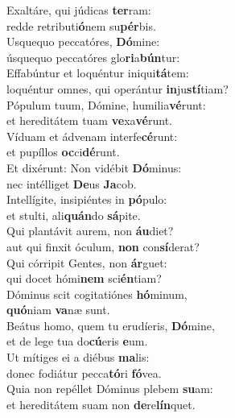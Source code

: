 \evenverse Exaltáre, qui júdicas \textbf{ter}ram:~\*\\
\evenverse redde retributi\textbf{ó}nem su\textbf{pér}bis.\\
\oddverse Usquequo peccatóres, \textbf{Dó}mine:~\*\\
\oddverse úsquequo peccatóres glo\textbf{ri}a\textbf{bún}tur:\\
\evenverse Effabúntur et loquéntur iniqui\textbf{tá}tem:~\*\\
\evenverse loquéntur omnes, qui operántur \textbf{in}ju\textbf{stí}tiam?\\
\oddverse Pópulum tuum, Dómine, humilia\textbf{vé}runt:~\*\\
\oddverse et hereditátem tuam \textbf{ve}xa\textbf{vé}runt.\\
\evenverse Víduam et ádvenam interfe\textbf{cé}runt:~\*\\
\evenverse et pupíllos \textbf{oc}ci\textbf{dé}runt.\\
\oddverse Et dixérunt: Non vidébit \textbf{Dó}minus:~\*\\
\oddverse nec intélliget \textbf{De}us \textbf{Ja}cob.\\
\evenverse Intellígite, insipiéntes in \textbf{pó}pulo:~\*\\
\evenverse et stulti, ali\textbf{quán}do \textbf{sá}pite.\\
\oddverse Qui plantávit aurem, non \textbf{áu}diet?~\*\\
\oddverse aut qui finxit óculum, \textbf{non} con\textbf{sí}derat?\\
\evenverse Qui córripit Gentes, non \textbf{ár}guet:~\*\\
\evenverse qui docet hómi\textbf{nem} sci\textbf{én}tiam?\\
\oddverse Dóminus scit cogitatiónes \textbf{hó}minum,~\*\\
\oddverse \textbf{quó}niam \textbf{va}næ sunt.\\
\evenverse Beátus homo, quem tu erudíeris, \textbf{Dó}mine,~\*\\
\evenverse et de lege tua do\textbf{cú}eris \textbf{e}um.\\
\oddverse Ut mítiges ei a diébus \textbf{ma}lis:~\*\\
\oddverse donec fodiátur pecca\textbf{tó}ri \textbf{fó}vea.\\
\evenverse Quia non repéllet Dóminus plebem \textbf{su}am:~\*\\
\evenverse et hereditátem suam non \textbf{de}re\textbf{lín}quet.\\
